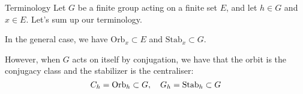 \documentclass[a4paper]{article}
\begin{document}
\begin{parag}{Terminology}
    Let $G$ be a finite group acting on a finite set $E$, and let $h \in G$ and $x \in E$. Let's sum up our terminology.

    In the general case, we have $\text{Orb}_x \subset E$ and $\text{Stab}_x \subset G$. 

    However, when $G$ acts on itself by conjugation, we have that the orbit is the conjugacy class and the stabilizer is the centraliser: 
    \[C_h = \text{Orb}_h \subset G, \quad G_h = \text{Stab}_h \subset G\]
\end{parag}
\end{document}
